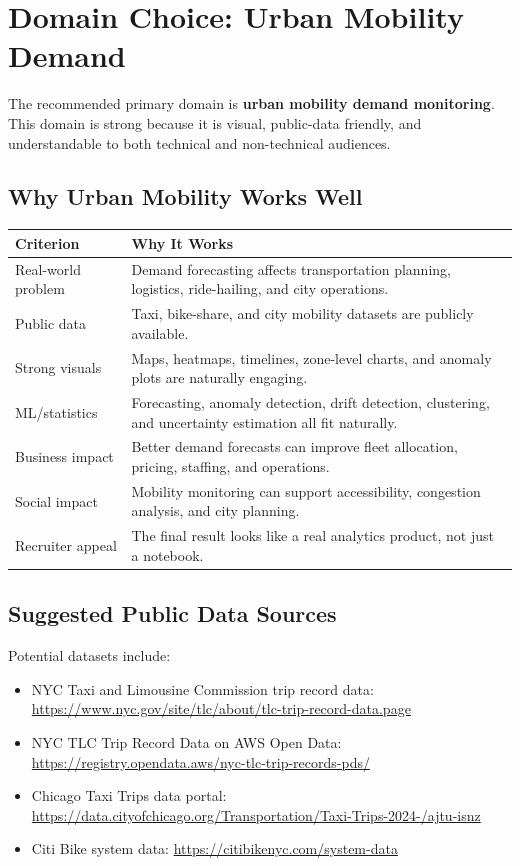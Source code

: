 \documentclass[11pt]{article}
\begin{document}
\section{Domain Choice: Urban Mobility Demand}

The recommended primary domain is \textbf{urban mobility demand monitoring}. This domain is strong because it is visual, public-data friendly, and understandable to both technical and non-technical audiences.

\subsection{Why Urban Mobility Works Well}

\begin{longtable}{p{}p{}}
\toprule
\textbf{Criterion} & \textbf{Why It Works} \\
\midrule
Real-world problem & Demand forecasting affects transportation planning, logistics, ride-hailing, and city operations. \\
Public data & Taxi, bike-share, and city mobility datasets are publicly available. \\
Strong visuals & Maps, heatmaps, timelines, zone-level charts, and anomaly plots are naturally engaging. \\
ML/statistics & Forecasting, anomaly detection, drift detection, clustering, and uncertainty estimation all fit naturally. \\
Business impact & Better demand forecasts can improve fleet allocation, pricing, staffing, and operations. \\
Social impact & Mobility monitoring can support accessibility, congestion analysis, and city planning. \\
Recruiter appeal & The final result looks like a real analytics product, not just a notebook. \\
\bottomrule
\end{longtable}

\subsection{Suggested Public Data Sources}

Potential datasets include:

\begin{itemize}
    \item NYC Taxi and Limousine Commission trip record data: \url{https://www.nyc.gov/site/tlc/about/tlc-trip-record-data.page}
    \item NYC TLC Trip Record Data on AWS Open Data: \url{https://registry.opendata.aws/nyc-tlc-trip-records-pds/}
    \item Chicago Taxi Trips data portal: \url{https://data.cityofchicago.org/Transportation/Taxi-Trips-2024-/ajtu-isnz}
    \item Citi Bike system data: \url{https://citibikenyc.com/system-data}
\end{itemize}
\end{document}
